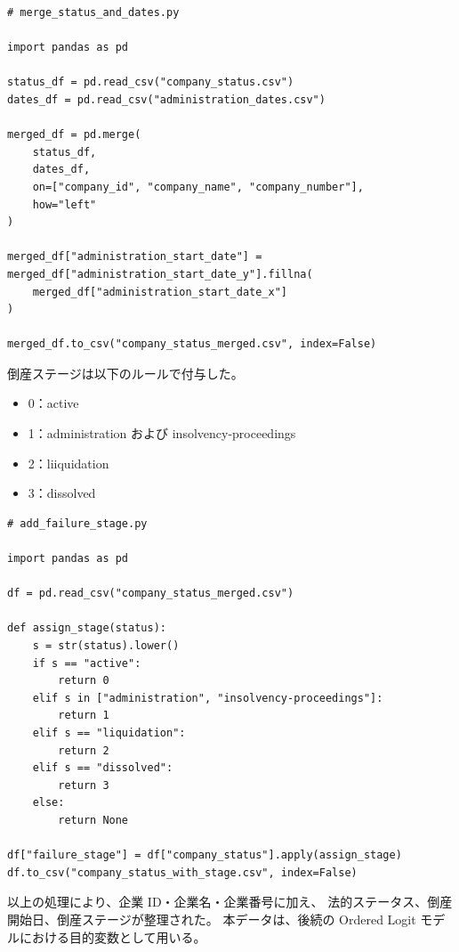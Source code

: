 \begin{verbatim}
# merge_status_and_dates.py

import pandas as pd

status_df = pd.read_csv("company_status.csv")
dates_df = pd.read_csv("administration_dates.csv")

merged_df = pd.merge(
    status_df,
    dates_df,
    on=["company_id", "company_name", "company_number"],
    how="left"
)

merged_df["administration_start_date"] = merged_df["administration_start_date_y"].fillna(
    merged_df["administration_start_date_x"]
)

merged_df.to_csv("company_status_merged.csv", index=False)
\end{verbatim}

倒産ステージは以下のルールで付与した。

\begin{itemize}
    \item 0：active
    \item 1：administration および insolvency-proceedings
    \item 2：liiquidation
    \item 3：dissolved
\end{itemize}

\begin{verbatim}
# add_failure_stage.py

import pandas as pd

df = pd.read_csv("company_status_merged.csv")

def assign_stage(status):
    s = str(status).lower()
    if s == "active":
        return 0
    elif s in ["administration", "insolvency-proceedings"]:
        return 1
    elif s == "liquidation":
        return 2
    elif s == "dissolved":
        return 3
    else:
        return None

df["failure_stage"] = df["company_status"].apply(assign_stage)
df.to_csv("company_status_with_stage.csv", index=False)
\end{verbatim}

以上の処理により、企業 ID・企業名・企業番号に加え、
法的ステータス、倒産開始日、倒産ステージが整理された。
本データは、後続の Ordered Logit モデルにおける目的変数として用いる。


